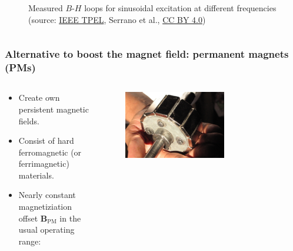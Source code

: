 \begin{frame}
\begin{columns}
\begin{column}{0.475\textwidth}
\begin{figure}
				\caption{Measured $B$-$H$ loops for sinusoidal excitation at different frequencies (source: \href{https://ieeexplore.ieee.org/abstract/document/10169101}{IEEE TPEL}, Serrano et al., \href{https://creativecommons.org/licenses/by/4.0/}{CC BY 4.0})}
			\end{figure}
		\end{column}
		\end{columns}
\end{frame}

\begin{frame}
	\frametitle{Alternative to boost the magnet field: permanent magnets (PMs)}
    \begin{columns}
        \begin{column}{0.48\textwidth}
        \begin{itemize}
            \item Create own persistent magnetic fields.
            \item Consist of hard ferromagnetic (or ferrimagnetic) materials.
            \item<2-> Nearly constant magnetiziation offset $\bm{B}_\mathrm{PM}$ in the usual operating range:
        \end{itemize}
        \end{column}
        \hfill
        \begin{column}{0.4\textwidth}
            \begin{figure}
                \centering
                \includegraphics[width=0.65\textwidth]{fig/lec02/PM_rotor_example.jpg}

\end{figure}
\end{column}
\end{columns}
\end{frame}
